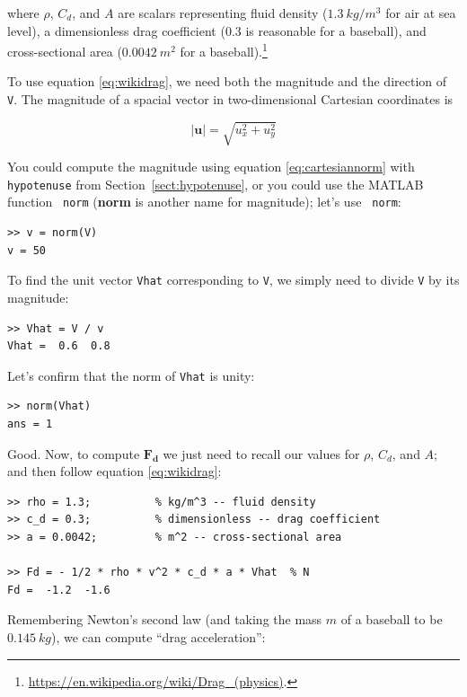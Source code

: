 \documentclass[
]{book}
\renewcommand{\vec}[1]{\bm{\mathbf{#1}}}
\newcommand{\norm}[1]{\lvert #1 \rvert}
\begin{document}
where $\rho$, $C_d$, and $A$ are scalars representing fluid density
($1.3 ~ kg/m^3$ for air at sea level), a dimensionless drag coefficient
($0.3$ is reasonable for a baseball), and cross-sectional area ($0.0042
~ m^2$ for a baseball).\footnote{
    \url{https://en.wikipedia.org/wiki/Drag_(physics)}.}

To use equation \eqref{eq:wikidrag}, we need both the magnitude and the
direction of {\tt V}. The magnitude of a spacial vector \vec{u} in
two-dimensional Cartesian coordinates is

\begin{equation}\label{eq:cartesiannorm}
    \norm{\vec{u}} = \sqrt{u_x^2 + u_y^2}
\end{equation}

You could compute the magnitude using equation
\eqref{eq:cartesiannorm} with {\tt hypotenuse} from
Section~\ref{sect:hypotenuse}, or you could use the MATLAB function {\tt
norm} ({\bf norm} is another name for magnitude); let's use {\tt
norm}:

\begin{verbatim}
>> v = norm(V)
v = 50
\end{verbatim}

To find the unit vector {\tt Vhat} corresponding to {\tt V}, we simply
need to divide {\tt V} by its magnitude:

\begin{verbatim}
>> Vhat = V / v
Vhat =  0.6  0.8
\end{verbatim}

Let's confirm that the norm of {\tt Vhat} is unity:

\begin{verbatim}
>> norm(Vhat)
ans = 1
\end{verbatim}

Good. Now, to compute $\vec{F_d}$ we just need to recall our values for
$\rho$, $C_d$, and $A$; and then follow equation \eqref{eq:wikidrag}:

\begin{verbatim}
>> rho = 1.3;          % kg/m^3 -- fluid density
>> c_d = 0.3;          % dimensionless -- drag coefficient 
>> a = 0.0042;         % m^2 -- cross-sectional area

>> Fd = - 1/2 * rho * v^2 * c_d * a * Vhat  % N
Fd =  -1.2  -1.6
\end{verbatim}

Remembering Newton's second law (and taking the mass $m$ of a baseball to be
$0.145 ~ kg$), we can compute ``drag acceleration'':
\end{document}
